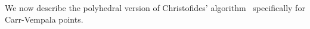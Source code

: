 We now describe the polyhedral version of Christofides' algorithm~\cite{Wolsey} specifically for Carr-Vempala points.
